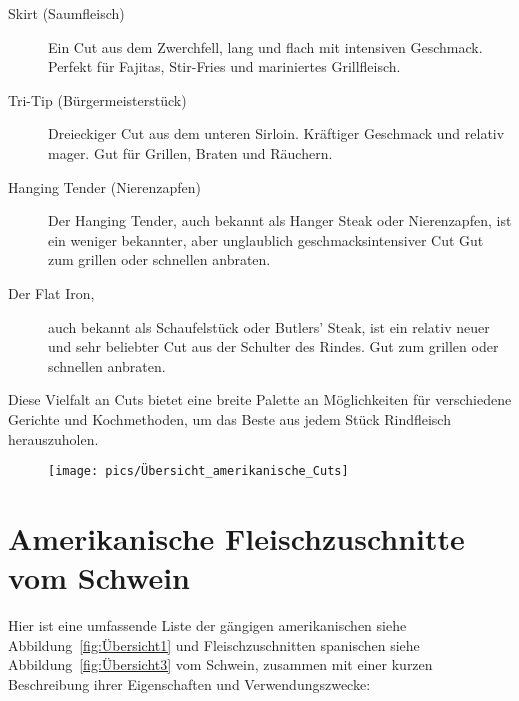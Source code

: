 \begin{description}
	\item [Skirt (Saumfleisch)] Ein Cut aus dem Zwerchfell, lang und flach mit 
	intensiven Geschmack.
	Perfekt für Fajitas, Stir-Fries und mariniertes Grillfleisch.
	
	\item [Tri-Tip (Bürgermeisterstück)] Dreieckiger Cut aus dem unteren 
	Sirloin. Kräftiger Geschmack und relativ mager.
	Gut für Grillen, Braten und Räuchern.
	
	\item [Hanging Tender (Nierenzapfen)] Der Hanging Tender, auch bekannt 
	als Hanger Steak oder Nierenzapfen, ist ein weniger bekannter, aber 
	unglaublich geschmacksintensiver Cut
	Gut zum grillen oder schnellen anbraten.
	
	\item [Der Flat Iron,] auch bekannt als Schaufelstück oder Butlers' 
	Steak, ist ein relativ neuer und sehr beliebter Cut aus der Schulter des 
	Rindes.
	Gut zum grillen oder schnellen anbraten.
\end{description}

Diese Vielfalt an Cuts bietet eine breite Palette an Möglichkeiten für 
verschiedene Gerichte und Kochmethoden,
um das Beste aus jedem Stück Rindfleisch herauszuholen. 

\begin{figure}[htbp]
	\centering
	\begin{minipage}{1\textwidth}
		\centering
		\texttt{[image: pics/Übersicht\_amerikanische\_Cuts]}
		\label{fig:Übersicht}
	\end{minipage}
\end{figure}
\newpage


\section{Amerikanische Fleischzuschnitte vom Schwein}

Hier ist eine umfassende Liste der gängigen amerikanischen siehe Abbildung~\vref{fig:Übersicht1} 
und Fleischzuschnitten spanischen siehe Abbildung~\vref{fig:Übersicht3} vom Schwein, 
zusammen mit einer kurzen Beschreibung ihrer Eigenschaften und Verwendungszwecke:

